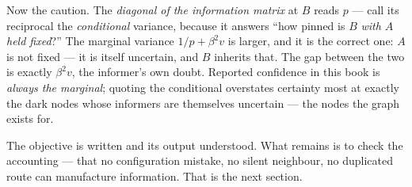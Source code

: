Now the caution.  The \emph{diagonal of the information matrix} at
$B$ reads $p$ --- call its reciprocal the \emph{conditional} variance,
because it answers ``how pinned is $B$ \emph{with $A$ held fixed}?''
The marginal variance $1/p+\beta^{2}v$ is larger, and it is the
correct one: $A$ is not fixed --- it is itself uncertain, and $B$
inherits that.  The gap between the two is exactly $\beta^{2}v$, the
informer's own doubt.  Reported confidence in this book is
\emph{always the marginal}; quoting the conditional overstates
certainty most at exactly the dark nodes whose informers are
themselves uncertain --- the nodes the graph exists for.

The objective is written and its output understood.  What remains is
to check the accounting --- that no configuration
mistake, no silent neighbour, no duplicated route can manufacture
information.  That is the next section.
